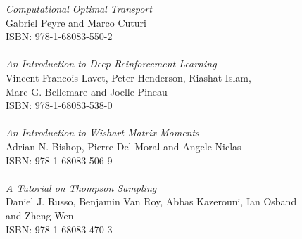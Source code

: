 \vspace{12pt}
\noindent \textit{Computational Optimal Transport}\\
Gabriel Peyre and Marco Cuturi\\
ISBN: 978-1-68083-550-2\\
\\
\noindent \textit{An Introduction to Deep Reinforcement Learning}\\
Vincent Francois-Lavet, Peter Henderson, Riashat Islam,\\ Marc G. Bellemare and Joelle Pineau \\
ISBN: 978-1-68083-538-0\\
\\
\noindent \textit{An Introduction to Wishart Matrix Moments}\\
Adrian N. Bishop, Pierre Del Moral and Angele Niclas \\
ISBN: 978-1-68083-506-9\\
\\
\noindent \textit{A Tutorial on Thompson Sampling}\\
Daniel J. Russo, Benjamin Van Roy, Abbas Kazerouni, Ian Osband\\ and Zheng Wen\\
ISBN: 978-1-68083-470-3\\